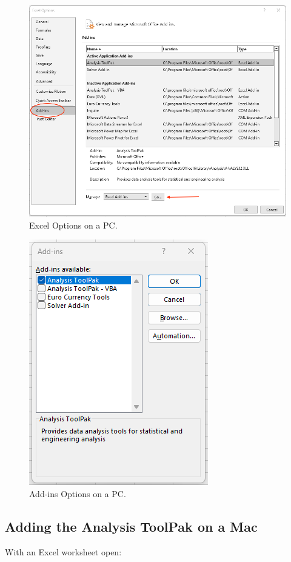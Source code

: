 \documentclass[
  12pt,
  letterpaper,
]{book}
\begin{document}
\begin{figure}

{\centering \includegraphics[width=0.75\linewidth]{images/toolpak-pc1} 

}

\caption{Excel Options on a PC.}\label{fig:analysis-toolpak-pc1}
\end{figure}
\begin{figure}

{\centering \includegraphics[width=0.35\linewidth]{images/toolpak-pc2} 

}

\caption{Add-ins Options on a PC.}\label{fig:analysis-toolpak-pc2}
\end{figure}

\hypertarget{adding-the-analysis-toolpak-on-a-mac}{%
\subsection{Adding the Analysis ToolPak on a Mac}\label{adding-the-analysis-toolpak-on-a-mac}}

With an Excel worksheet open:
\end{document}
